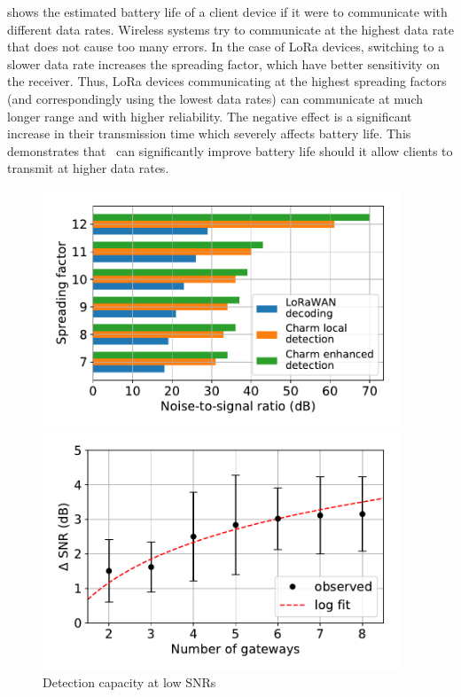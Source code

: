  shows the estimated battery life of a client device if it were to communicate with different data rates. Wireless systems try to communicate at the highest data rate that does not cause too many errors. In the case of LoRa devices, switching to a slower data rate increases the spreading factor,  which have better sensitivity on the receiver. Thus, LoRa devices communicating at the highest spreading factors (and correspondingly using the lowest data rates) can communicate at much longer range and with higher reliability. The negative effect is a significant increase in their transmission time which severely affects battery life. This demonstrates that \name\ can significantly improve battery life should it allow clients to transmit at higher data rates. 

\begin{figure}
\hfill
\begin{minipage}{.32\textwidth}
\centering
\includegraphics[width=0.95\textwidth]{figures/local_detection_limits}
\hspace*{-0.1in}
\caption{Detection capacity at low SNRs}
\label{fig:local-detection}
\compactimg
\end{minipage}
\hfill
\begin{minipage}{.32\textwidth}
\centering
\includegraphics[width=0.95\textwidth]{figures/diversity_gain}

\end{minipage}
\end{figure}
